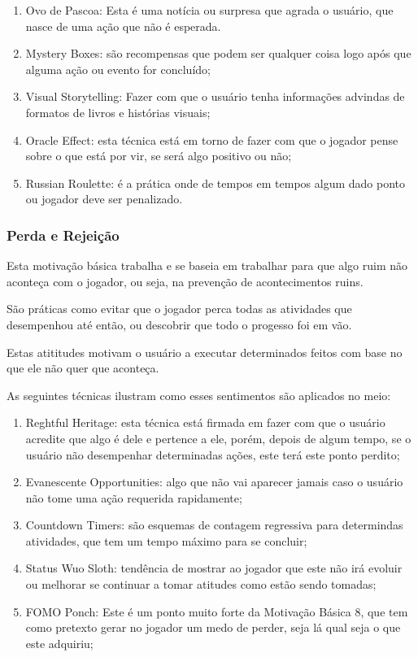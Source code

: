 \begin{enumerate}
    \item Ovo de Pascoa: Esta é uma notícia ou surpresa que agrada o usuário,
        que nasce de uma ação que não é esperada.
    \item Mystery Boxes: são recompensas que podem ser qualquer coisa
        logo após que alguma ação ou evento for concluído;
    \item Visual Storytelling: Fazer com que o usuário tenha informações
        advindas de formatos de livros e histórias
        visuais;
    \item Oracle Effect: esta técnica está em torno de fazer com que o
        jogador pense sobre o que está por vir, se será algo positivo ou não;
    \item Russian Roulette: é a prática onde de tempos em tempos algum dado ponto
        ou jogador deve ser penalizado.
\end{enumerate}

\subsubsection{Perda e Rejeição}
\label{sub:perdaerejeicao}
Esta motivação básica trabalha e se baseia em trabalhar para que algo ruim não
aconteça com o jogador, ou seja, na prevenção de acontecimentos ruins.

São práticas como evitar que o jogador perca todas as atividades que desempenhou
até então, ou descobrir que todo o progesso foi em vão.

Estas atititudes motivam o usuário a executar determinados feitos com base no que
ele não quer que aconteça.

As seguintes técnicas ilustram como esses sentimentos são aplicados no meio:

\begin{enumerate}
    \item Reghtful Heritage: esta técnica está firmada em fazer com que o usuário
        acredite que algo é dele e pertence a ele, porém, depois de algum tempo,
        se o usuário não desempenhar determinadas ações, este terá este ponto
        perdito;
    \item Evanescente Opportunities: algo que não vai aparecer jamais
        caso o usuário não tome uma ação requerida rapidamente;
    \item Countdown Timers: são esquemas de contagem regressiva para determindas
        atividades, que tem um tempo máximo para se concluir;
    \item Status Wuo Sloth: tendência de mostrar ao jogador que este não irá evoluir ou melhorar se continuar
        a tomar atitudes como estão sendo tomadas;
    \item FOMO Ponch: Este é um ponto muito forte da Motivação Básica 8, que tem como
        pretexto gerar no jogador um medo de perder, seja lá qual seja o
        que este adquiriu;
\end{enumerate}

